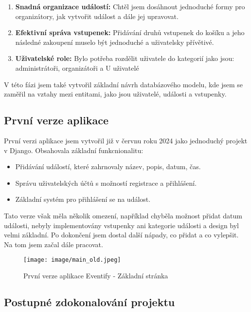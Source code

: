 \documentclass[12pt, a4paper,
twoside,        %
openright
]{report}
\begin{document}
\begin{enumerate}
	\item \textbf{Snadná organizace událostí:} Chtěl jsem dosáhnout jednoduché formy pro organizátory, jak vytvořit událost a dále jej upravovat.
	\item \textbf{Efektivní správa vstupenek:} Přidávání druhů vstupenek do košíku a jeho následné zakoupení muselo být jednoduché a uživatelsky přívětivé.
	\item \textbf{Uživatelské role:} Bylo potřeba rozdělit uživatele do kategorií jako jsou: administrátoři, organizátoři a U
	uživatelé
\end{enumerate}

V této fázi jsem také vytvořil základní návrh databázového modelu, kde jsem se zaměřil na vztahy mezi entitami, jako jsou uživatelé, události a vstupenky. 

\subsection{První verze aplikace}

První verzi aplikace jsem vytvořil již v červnu roku 2024 jako jednoduchý projekt v Django. Obsahovala základní funkcnionalitu:

\begin{itemize}
	\item Přidávání událostí, které zahrnovaly název, popis, datum, čas.
	\item Správu uživatelských účtů s možností registrace a přihlášení.
	\item Základní systém pro přihlášení se na událost.
\end{itemize}

Tato verze však měla několik omezení, například chyběla možnost přidat datum události, nebyly implementovány vstupenky ani kategorie události a design byl velmi základní. \linebreak Po dokončení jsem dostal další nápady, co přidat a co vylepšit. Na tom jsem začal dále pracovat.

\begin{figure}[h!]
	\centering %
	\texttt{[image: image/main\_old.jpeg]} %
	\caption{První verze aplikace Eventify - Základní stránka} %
	\label{fig:mainold} %
\end{figure}

\subsection{Postupné zdokonalování projektu}
\end{document}
